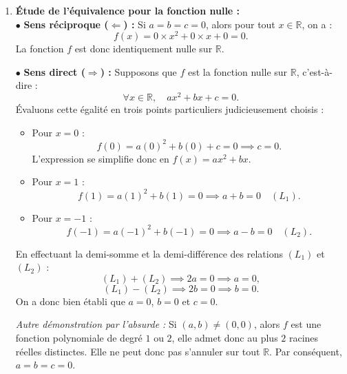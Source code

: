 \documentclass[11pt,a4paper]{article}
\begin{document}
\begin{correctionbox}
\begin{enumerate}
    \item \textbf{Étude de l'équivalence pour la fonction nulle :}\\
    $\bullet$ \textbf{Sens réciproque ($\Longleftarrow$) :} Si $a = b = c = 0$, alors pour tout $x \in \mathbb{R}$, on a :
    \[
    f(x) = 0 \times x^2 + 0 \times x + 0 = 0.
    \]
    La fonction $f$ est donc identiquement nulle sur $\mathbb{R}$.

    $\bullet$ \textbf{Sens direct ($\Longrightarrow$) :} Supposons que $f$ est la fonction nulle sur $\mathbb{R}$, c'est-à-dire :
    \[
    \forall x \in \mathbb{R}, \quad ax^2 + bx + c = 0.
    \]
    Évaluons cette égalité en trois points particuliers judicieusement choisis :
    \begin{itemize}[leftmargin=*,label=\textbullet]
        \item Pour $x = 0$ :
        \[
        f(0) = a(0)^2 + b(0) + c = 0 \implies c = 0.
        \]
        L'expression se simplifie donc en $f(x) = ax^2 + bx$.
        \item Pour $x = 1$ :
        \[
        f(1) = a(1)^2 + b(1) = 0 \implies a + b = 0 \quad (L_1).
        \]
        \item Pour $x = -1$ :
        \[
        f(-1) = a(-1)^2 + b(-1) = 0 \implies a - b = 0 \quad (L_2).
        \]
    \end{itemize}
    En effectuant la demi-somme et la demi-différence des relations $(L_1)$ et $(L_2)$ :
    \[
    (L_1) + (L_2) \implies 2a = 0 \implies a = 0,
    \]
    \[
    (L_1) - (L_2) \implies 2b = 0 \implies b = 0.
    \]
    On a donc bien établi que $a = 0$, $b = 0$ et $c = 0$.

    \textit{Autre démonstration par l'absurde :} Si $(a, b) \neq (0, 0)$, alors $f$ est une fonction polynomiale de degré $1$ ou $2$, elle admet donc au plus $2$ racines réelles distinctes. Elle ne peut donc pas s'annuler sur tout $\mathbb{R}$. Par conséquent, $a = b = c = 0$.


\end{enumerate}
\end{correctionbox}
\end{document}
